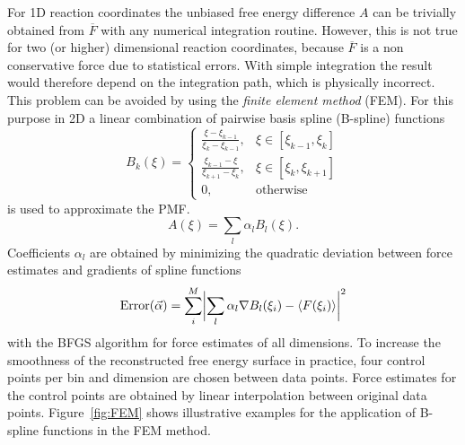 For 1D reaction coordinates the unbiased free energy difference $A$ can be trivially obtained from $\overline{F}$ with any numerical integration routine.\autocite{davis2007methods}
However, this is not true for two (or higher) dimensional reaction coordinates, because $\overline{F}$ is a non conservative force due to statistical errors.\autocite{comer2015adaptive} With simple integration the result would therefore depend on the integration path, which is physically incorrect. This problem can be avoided by using the \textit{finite element method} (FEM).\autocite{darve2008adaptive} For this purpose in 2D a linear combination of pairwise basis spline (B-spline)\autocite{de1972calculating} functions
\begin{equation}
  B_k(\xi)=\left\{\begin{array}{ll} \frac{\xi-\xi_{k-1}}{\xi_k-\xi_{k-1}}, & \xi \in [\xi_{k-1},\xi_k] \\
                                    \frac{\xi_{k-1}-\xi}{\xi_{k+1}-\xi_{k}}, & \xi \in [\xi_{k},\xi_{k+1}] \\
                                    0, & \text{otherwise}
                  \end{array}\right.
  \label{eq:B spline}
\end{equation}
is used to approximate the PMF.
\begin{equation}
  A(\xi) = \sum_l \alpha_l B_l(\xi). \label{eq:FEM}
\end{equation}
Coefficients $\alpha_l$ are obtained by minimizing the quadratic deviation between force estimates and gradients of spline functions
\begin{equation}
\text{Error}(\vec{\alpha})=\sum_i^M\biggl|\sum_l \alpha_l \nabla B_l(\xi_i) - \braket{F(\xi_i)} \biggr|^2
  \label{eq:RMSD}
\end{equation}
with the BFGS algorithm\autocite{nocedal2006numerical} for force estimates of all dimensions.\autocite{darve2008adaptive} To increase the smoothness of the reconstructed free energy surface in practice, four control points per bin and dimension are chosen between data points. Force estimates for the control points are obtained by linear interpolation between original data points. Figure~\ref{fig:FEM} shows illustrative examples for the application of B-spline functions in the FEM method.

